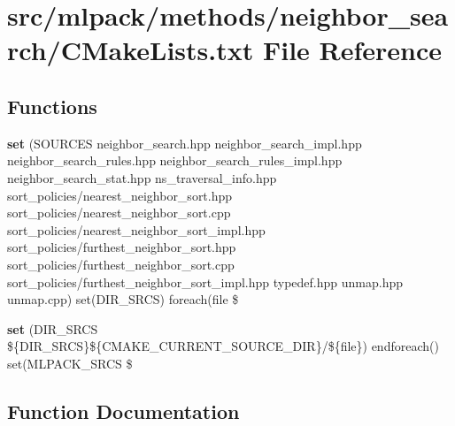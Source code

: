 \section{src/mlpack/methods/neighbor\-\_\-search/\-C\-Make\-Lists.txt File Reference}
\label{methods_2neighbor__search_2CMakeLists_8txt}
\subsection*{Functions}
\begin{DoxyCompactItemize}
\item 
{\bf set} (S\-O\-U\-R\-C\-E\-S neighbor\-\_\-search.\-hpp neighbor\-\_\-search\-\_\-impl.\-hpp neighbor\-\_\-search\-\_\-rules.\-hpp neighbor\-\_\-search\-\_\-rules\-\_\-impl.\-hpp neighbor\-\_\-search\-\_\-stat.\-hpp ns\-\_\-traversal\-\_\-info.\-hpp sort\-\_\-policies/nearest\-\_\-neighbor\-\_\-sort.\-hpp sort\-\_\-policies/nearest\-\_\-neighbor\-\_\-sort.\-cpp sort\-\_\-policies/nearest\-\_\-neighbor\-\_\-sort\-\_\-impl.\-hpp sort\-\_\-policies/furthest\-\_\-neighbor\-\_\-sort.\-hpp sort\-\_\-policies/furthest\-\_\-neighbor\-\_\-sort.\-cpp sort\-\_\-policies/furthest\-\_\-neighbor\-\_\-sort\-\_\-impl.\-hpp typedef.\-hpp unmap.\-hpp unmap.\-cpp) set(D\-I\-R\-\_\-\-S\-R\-C\-S) foreach(file \$
\item 
{\bf set} (D\-I\-R\-\_\-\-S\-R\-C\-S \$\{D\-I\-R\-\_\-\-S\-R\-C\-S\}\$\{C\-M\-A\-K\-E\-\_\-\-C\-U\-R\-R\-E\-N\-T\-\_\-\-S\-O\-U\-R\-C\-E\-\_\-\-D\-I\-R\}/\$\{file\}) endforeach() set(M\-L\-P\-A\-C\-K\-\_\-\-S\-R\-C\-S \$
\end{DoxyCompactItemize}


\subsection{Function Documentation}

